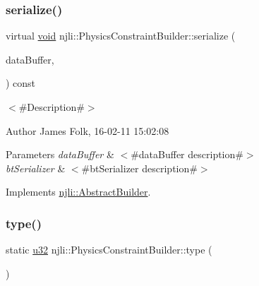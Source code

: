 \subsubsection{\texorpdfstring{serialize()}{serialize()}}
{\footnotesize\ttfamily virtual \mbox{\hyperlink{_thread_8h_af1e856da2e658414cb2456cb6f7ebc66}{void}} njli\+::\+Physics\+Constraint\+Builder\+::serialize (\begin{DoxyParamCaption}\item[{\mbox{\hyperlink{_thread_8h_af1e856da2e658414cb2456cb6f7ebc66}{void}} $\ast$}]{data\+Buffer,  }\item[{bt\+Serializer $\ast$}]{ }\end{DoxyParamCaption}) const\hspace{0.3cm}{\ttfamily [virtual]}}



$<$\#\+Description\#$>$ 

\begin{DoxyAuthor}{Author}
James Folk, 16-\/02-\/11 15\+:02\+:08
\end{DoxyAuthor}

\begin{DoxyParams}{Parameters}
{\em data\+Buffer} & $<$\#data\+Buffer description\#$>$ \\
\hline
{\em bt\+Serializer} & $<$\#bt\+Serializer description\#$>$ \\
\hline
\end{DoxyParams}


Implements \mbox{\hyperlink{classnjli_1_1_abstract_builder_ab66b774e02ccb9da554c9aab7fa6d981}{njli\+::\+Abstract\+Builder}}.

\mbox{\label{classnjli_1_1_physics_constraint_builder_ab8ad4dfe06ff661fd64efda7ab1666d1}} 
\subsubsection{\texorpdfstring{type()}{type()}}
{\footnotesize\ttfamily static \mbox{\hyperlink{_util_8h_a10e94b422ef0c20dcdec20d31a1f5049}{u32}} njli\+::\+Physics\+Constraint\+Builder\+::type (\begin{DoxyParamCaption}{ }\end{DoxyParamCaption})\hspace{0.3cm}{\ttfamily [static]}}

